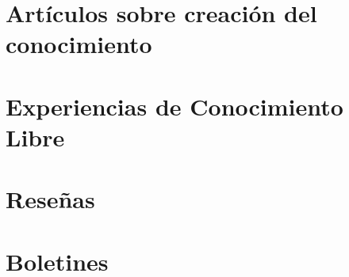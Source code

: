 \documentclass[12pt,letterpaper]{book}
\begin{document}
\hojaportada
\hojalicencia

\tablacontenido
\hojapresentacion
\hojaeditorial
\mainmatter
\fancychapterstyle

\chapter{Artículos sobre creación del conocimiento}\BgThispage


\chapter{Experiencias de Conocimiento Libre}\BgThispage
%

\chapter{Reseñas}\BgThispage
%

\chapter{Boletines}\BgThispage
%

\hojacontraportada
\end{document}
